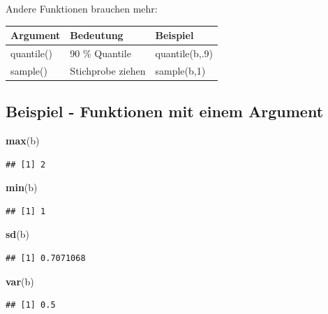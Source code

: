 \documentclass[]{article}
\newenvironment{Shaded}{\begin{snugshade}}{\end{snugshade}}
\newcommand{\KeywordTok}[1]{\textcolor[rgb]{0.13,0.29,0.53}{\textbf{{#1}}}}
\newcommand{\NormalTok}[1]{{#1}}
\begin{document}
Andere Funktionen brauchen mehr:

\begin{longtable}[]{@{}lll@{}}
\toprule
Argument & Bedeutung & Beispiel\tabularnewline
\midrule
\endhead
quantile() & 90 \% Quantile & quantile(b,.9)\tabularnewline
sample() & Stichprobe ziehen & sample(b,1)\tabularnewline
\bottomrule
\end{longtable}

\subsection{Beispiel - Funktionen mit einem
Argument}\label{beispiel---funktionen-mit-einem-argument}

\begin{Shaded}
\begin{Highlighting}[]
\KeywordTok{max}\NormalTok{(b)}
\end{Highlighting}
\end{Shaded}

\begin{verbatim}
## [1] 2
\end{verbatim}

\begin{Shaded}
\begin{Highlighting}[]
\KeywordTok{min}\NormalTok{(b)}
\end{Highlighting}
\end{Shaded}

\begin{verbatim}
## [1] 1
\end{verbatim}

\begin{Shaded}
\begin{Highlighting}[]
\KeywordTok{sd}\NormalTok{(b)}
\end{Highlighting}
\end{Shaded}

\begin{verbatim}
## [1] 0.7071068
\end{verbatim}

\begin{Shaded}
\begin{Highlighting}[]
\KeywordTok{var}\NormalTok{(b)}
\end{Highlighting}
\end{Shaded}

\begin{verbatim}
## [1] 0.5
\end{verbatim}
\end{document}
